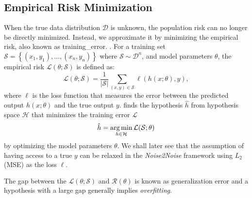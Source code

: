 \subsection{Empirical Risk Minimization}\label{sec:erm}
When the true data distribution $\mathcal{D}$ is unknown, the population risk can no longer be directly minimized. Instead, we approximate it by minimizing the empirical risk, also known as \gls{training_error}. . For a training set $\mathcal{S} = \left\{ (x_1, y_1), \ldots, (x_n, y_n) \right\}$ where $\mathcal{S} \sim \mathcal{D}^n$, and model parameters $\theta$, the empirical risk $\mathcal{L}(\theta; \mathcal{S})$ is defined as:
\begin{equation}
    \mathcal{L}(\theta; \mathcal{S}) = \frac{1}{\lvert \mathcal{S} \rvert} \sum_{(x, y) \in \mathcal{S}} \ell(h(x; \theta), y),
\end{equation}
where $\ell$ is the loss function that measures the error between the predicted output $h(x; \theta)$ and the true output $y$.  finds the hypothesis $\hat{h}$ from hypothesis space $\mathcal{H}$ that minimizes the training error $\mathcal{L}$
\begin{equation}\label{eq:erm}
    \hat{h} = \operatorname*{arg\,min}_{h \in \mathcal{H}} \mathcal{L}(\mathcal{S};\theta)
\end{equation}
by optimizing the model parameters $\theta$.
We shall later see that the assumption of having access to a true $y$ can be relaxed in the \textit{Noise2Noise} framework using $L_2$ (\gls{MSE}) as the loss $\ell$.

The gap between the $\mathcal{L}(\theta; \mathcal{S})$ and $\mathcal{R}(\theta)$ is known as generalization error and a hypothesis with a large gap generally implies \textit{overfitting}.

